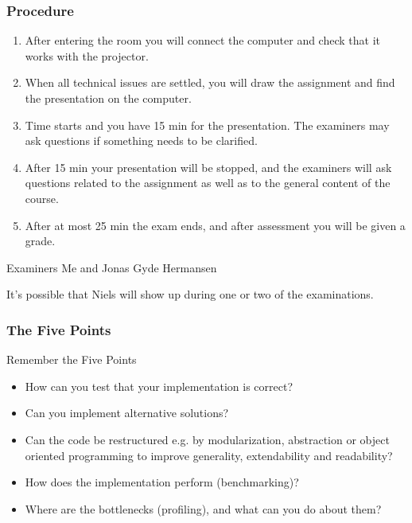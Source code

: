 \documentclass[aspectratio=1610,onlytextwidth]{beamer}
\begin{document}
\begin{frame}[c]
  \frametitle{Procedure}
  \begin{enumerate}[<+->]
    \item After entering the room you will connect the computer and check that
          it works with the projector.
    \item When all technical issues are settled,
          you will draw the assignment and find the presentation on the computer.
    \item Time starts and you have 15 min for the presentation. The examiners
          may ask questions if something needs to be clarified.
    \item After 15 min
          your presentation will be stopped, and the examiners will ask questions
          related to the assignment as well as to the general content of the
          course.
    \item After at most 25 min the exam ends, and after assessment
          you will be given a grade.
  \end{enumerate}

  \pause

  \begin{block}{Examiners}
    Me and Jonas Gyde Hermansen

    \medskip

    It's possible that Niels will show up during one or two of the examinations.
  \end{block}

\end{frame}

\begin{frame}[c]
  \frametitle{The Five Points}

  \begin{block}{Remember the Five Points}
    \begin{itemize}[<+->]
      \item How can you test that your implementation is correct?
      \item Can you implement alternative solutions?
      \item Can the code be restructured e.g. by modularization, abstraction or object oriented programming to improve generality, extendability and readability?
      \item How does the implementation perform (benchmarking)?
      \item Where are the bottlenecks (profiling), and what can you do about them?
    \end{itemize}
  \end{block}
\end{frame}
\end{document}
